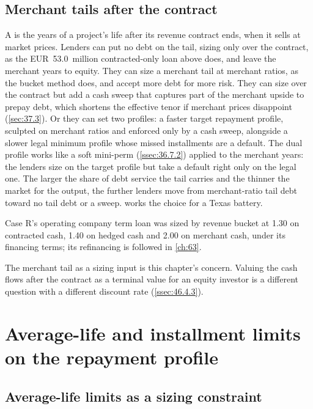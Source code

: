 \subsection{Merchant tails after the contract}\label{ssec:36.8.2}

A  is the years of a project's life after its revenue contract ends, when it sells at market prices. Lenders can put no debt on the tail, sizing only over the contract, as the EUR~53.0~million contracted-only loan above does, and leave the merchant years to equity. They can size a merchant tail at merchant ratios, as the bucket method does, and accept more debt for more risk. They can size over the contract but add a cash sweep that captures part of the merchant upside to prepay debt, which shortens the effective tenor if merchant prices disappoint (\cref{sec:37.3}). Or they can set two profiles: a faster target repayment profile, sculpted on merchant ratios and enforced only by a cash sweep, alongside a slower legal minimum profile whose missed installments are a default. The dual profile works like a soft mini-perm (\cref{ssec:36.7.2}) applied to the merchant years: the lenders size on the target profile but take a default right only on the legal one. The larger the share of debt service the tail carries and the thinner the market for the output, the further lenders move from merchant-ratio tail debt toward no tail debt or a sweep.  works the choice for a Texas battery.

Case R's operating company term loan was sized by revenue bucket at 1.30\x{} on contracted cash, 1.40\x{} on hedged cash and 2.00\x{} on merchant cash, under its financing terms; its refinancing is followed in \cref{ch:63}.

The merchant tail as a sizing input is this chapter's concern. Valuing the cash flows after the contract as a terminal value for an equity investor is a different question with a different discount rate (\cref{ssec:46.4.3}).

\section{Average-life and installment limits on the repayment profile}\label{sec:36.9}

\subsection{Average-life limits as a sizing constraint}\label{ssec:36.9.1}

